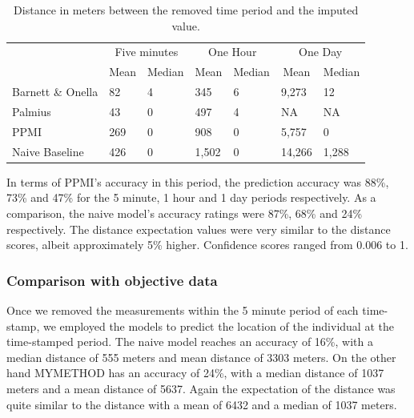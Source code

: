 \documentclass[man]{apa6}
\theoremstyle{definition}
\theoremstyle{definition}
\theoremstyle{definition}
\theoremstyle{remark}
\begin{document}
\begin{table}[htb]
\begin{center}
\begin{threeparttable}
\caption{\label{tab:resulttable}Distance in meters between the removed time period and the imputed value.}
\begin{tabular}{lllllll}
\toprule
 & \multicolumn{2}{c}{Five minutes} & \multicolumn{2}{c}{One Hour} & \multicolumn{2}{c}{One Day} \\
\cmidrule(r){2-3} \cmidrule(r){4-5} \cmidrule(r){6-7}
 & \multicolumn{1}{c}{Mean} & \multicolumn{1}{c}{Median} & \multicolumn{1}{c}{Mean} & \multicolumn{1}{c}{Median} & \multicolumn{1}{c}{Mean} & \multicolumn{1}{c}{Median}\\
\midrule
Barnett \& Onella & 82 & 4 & 345 & 6 & 9,273 & 12\\
Palmius & 43 & 0 & 497 & 4 & NA & NA\\
PPMI & 269 & 0 & 908 & 0 & 5,757 & 0\\
Naive Baseline & 426 & 0 & 1,502 & 0 & 14,266 & 1,288\\
\bottomrule
\end{tabular}
\end{threeparttable}
\end{center}
\end{table}

In terms of PPMI's accuracy in this period, the prediction accuracy was
88\%, 73\% and 47\% for the 5 minute, 1 hour and 1 day periods
respectively. As a comparison, the naive model's accuracy ratings were
87\%, 68\% and 24\% respectively. The distance expectation values were
very similar to the distance scores, albeit approximately 5\% higher.
Confidence scores ranged from 0.006 to 1.

\subsubsection{Comparison with objective
data}\label{comparison-with-objective-data}

Once we removed the measurements within the 5 minute period of each
time-stamp, we employed the models to predict the location of the
individual at the time-stamped period. The naive model reaches an
accuracy of 16\%, with a median distance of 555 meters and mean distance
of 3303 meters. On the other hand MYMETHOD has an accuracy of 24\%, with
a median distance of 1037 meters and a mean distance of 5637. Again the
expectation of the distance was quite similar to the distance with a
mean of 6432 and a median of 1037 meters.
\end{document}
